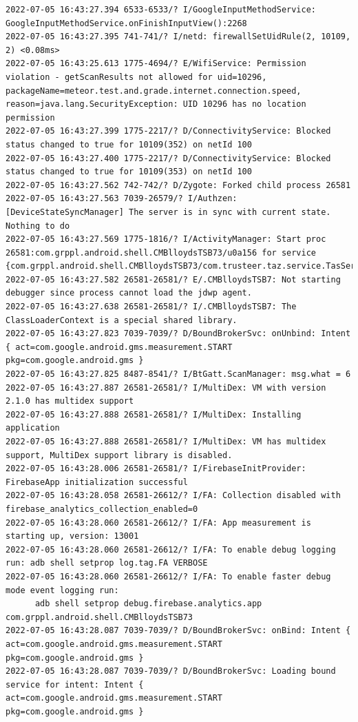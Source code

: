 \documentclass[a4paper,12pt]{book}
\begin{document}
\begin{lstlisting}
2022-07-05 16:43:27.394 6533-6533/? I/GoogleInputMethodService: GoogleInputMethodService.onFinishInputView():2268 
2022-07-05 16:43:27.395 741-741/? I/netd: firewallSetUidRule(2, 10109, 2) <0.08ms>
2022-07-05 16:43:25.613 1775-4694/? E/WifiService: Permission violation - getScanResults not allowed for uid=10296, packageName=meteor.test.and.grade.internet.connection.speed, reason=java.lang.SecurityException: UID 10296 has no location permission
2022-07-05 16:43:27.399 1775-2217/? D/ConnectivityService: Blocked status changed to true for 10109(352) on netId 100
2022-07-05 16:43:27.400 1775-2217/? D/ConnectivityService: Blocked status changed to true for 10109(353) on netId 100
2022-07-05 16:43:27.562 742-742/? D/Zygote: Forked child process 26581
2022-07-05 16:43:27.563 7039-26579/? I/Authzen: [DeviceStateSyncManager] The server is in sync with current state. Nothing to do
2022-07-05 16:43:27.569 1775-1816/? I/ActivityManager: Start proc 26581:com.grppl.android.shell.CMBlloydsTSB73/u0a156 for service {com.grppl.android.shell.CMBlloydsTSB73/com.trusteer.taz.service.TasService}
2022-07-05 16:43:27.582 26581-26581/? E/.CMBlloydsTSB7: Not starting debugger since process cannot load the jdwp agent.
2022-07-05 16:43:27.638 26581-26581/? I/.CMBlloydsTSB7: The ClassLoaderContext is a special shared library.
2022-07-05 16:43:27.823 7039-7039/? D/BoundBrokerSvc: onUnbind: Intent { act=com.google.android.gms.measurement.START pkg=com.google.android.gms }
2022-07-05 16:43:27.825 8487-8541/? I/BtGatt.ScanManager: msg.what = 6
2022-07-05 16:43:27.887 26581-26581/? I/MultiDex: VM with version 2.1.0 has multidex support
2022-07-05 16:43:27.888 26581-26581/? I/MultiDex: Installing application
2022-07-05 16:43:27.888 26581-26581/? I/MultiDex: VM has multidex support, MultiDex support library is disabled.
2022-07-05 16:43:28.006 26581-26581/? I/FirebaseInitProvider: FirebaseApp initialization successful
2022-07-05 16:43:28.058 26581-26612/? I/FA: Collection disabled with firebase_analytics_collection_enabled=0
2022-07-05 16:43:28.060 26581-26612/? I/FA: App measurement is starting up, version: 13001
2022-07-05 16:43:28.060 26581-26612/? I/FA: To enable debug logging run: adb shell setprop log.tag.FA VERBOSE
2022-07-05 16:43:28.060 26581-26612/? I/FA: To enable faster debug mode event logging run:
      adb shell setprop debug.firebase.analytics.app com.grppl.android.shell.CMBlloydsTSB73
2022-07-05 16:43:28.087 7039-7039/? D/BoundBrokerSvc: onBind: Intent { act=com.google.android.gms.measurement.START pkg=com.google.android.gms }
2022-07-05 16:43:28.087 7039-7039/? D/BoundBrokerSvc: Loading bound service for intent: Intent { act=com.google.android.gms.measurement.START pkg=com.google.android.gms }

\end{lstlisting}
\end{document}

